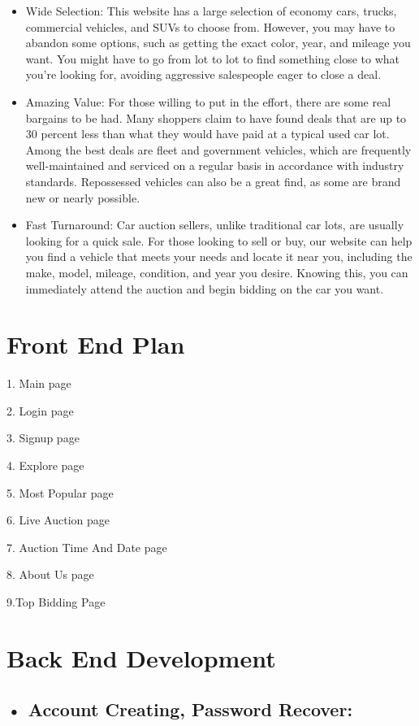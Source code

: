 \documentclass{report}
\begin{document}
\begin{itemize}
\item  Wide Selection: This website has a large selection of economy cars, trucks, commercial vehicles, and SUVs to choose from. However, you may have to abandon some options, such as getting the exact color, year, and mileage you want. You might have to go from lot to lot to find something close to what you're looking for, avoiding aggressive salespeople eager to close a deal.
\item  Amazing Value: For those willing to put in the effort, there are some real bargains to be had. Many shoppers claim to have found deals that are up to 30 percent less than what they would have paid at a typical used car lot. Among the best deals are fleet and government vehicles, which are frequently well-maintained and serviced on a regular basis in accordance with industry standards. Repossessed vehicles can also be a great find, as some are brand new or nearly possible.
\item  Fast Turnaround: Car auction sellers, unlike traditional car lots, are usually looking for a quick sale. For those looking to sell or buy, our website can help you find a vehicle that meets your needs and locate it near you, including the make, model, mileage, condition, and year you desire. Knowing this, you can immediately attend the auction and begin bidding on the car you want.
\end{itemize}

\section*{Front End Plan}


1. Main page

2. Login page

3. Signup page

4. Explore page

5. Most Popular page

6. Live Auction page

7. Auction Time And Date page

8. About Us page

9.Top Bidding Page


\section*{Back End Development}

\subsection*{• Account Creating, Password Recover:} 
\end{document}
